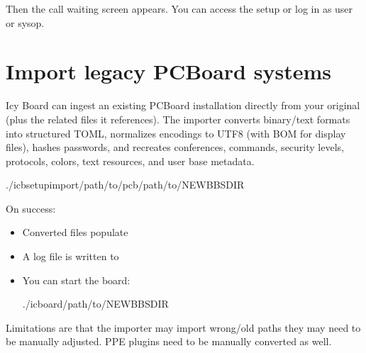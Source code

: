\documentclass[letterpaper,10pt,english]{sphinxmanual}
\begin{document}
\sphinxAtStartPar
Then the call waiting screen appears. You can access the setup or log in as user or sysop.


\section{Import legacy PCBoard systems}
\label{\detokenize{index:import-legacy-pcboard-systems}}
\sphinxAtStartPar
Icy Board can ingest an existing PCBoard installation directly from your original
 (plus the related files it references). The importer converts
binary/text formats into structured TOML, normalizes encodings to UTF\sphinxhyphen{}8 (with BOM
for display files), hashes passwords, and recreates conferences, commands,
security levels, protocols, colors, text resources, and user base metadata.

\begin{sphinxVerbatim}[commandchars=\\\{\}]
./icbsetupimport/path/to/pcb/path/to/NEW\PYGZus{}BBS\PYGZus{}DIR
\end{sphinxVerbatim}

\sphinxAtStartPar
On success:
\begin{itemize}
\item {} 
\sphinxAtStartPar
Converted files populate 

\item {} 
\sphinxAtStartPar
A log file is written to 

\item {} 
\sphinxAtStartPar
You can start the board:

\begin{sphinxVerbatim}[commandchars=\\\{\}]
./icboard/path/to/NEW\PYGZus{}BBS\PYGZus{}DIR
\end{sphinxVerbatim}

\end{itemize}

\sphinxAtStartPar
Limitations are that the importer may import wrong/old paths \sphinxhyphen{} they may need to be manually adjusted.
PPE plugins need to be manually converted as well.
\end{document}
